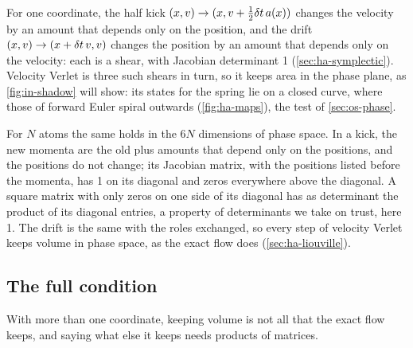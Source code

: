 For one coordinate, the half kick $(x, v) \to (x, v + \frac12\delta t\,a(x))$
changes the velocity by an amount that depends only on the position, and
the drift $(x, v) \to (x + \delta t\,v, v)$ changes the position by an amount
that depends only on the velocity: each is a shear, with Jacobian
determinant 1 (\cref{sec:ha-symplectic}). Velocity Verlet is three such
shears in turn, so it keeps area in the phase plane, as \cref{fig:in-shadow}
will show: its states for the spring lie on a closed curve, where those of
forward Euler spiral outwards (\cref{fig:ha-maps}), the test of
\cref{sec:os-phase}.

For $N$ atoms the same holds in the $6N$ dimensions of phase space. In a
kick, the new momenta are the old plus amounts that depend only on the
positions, and the positions do not change; its Jacobian matrix, with the
positions listed before the momenta, has 1 on its diagonal and zeros
everywhere above the diagonal. A square matrix with only zeros on one side
of its diagonal has as determinant the product of its diagonal entries, a
property of determinants we take on trust, here 1. The drift is the same
with the roles exchanged, so every step of velocity Verlet keeps volume in
phase space, as the exact flow does (\cref{sec:ha-liouville}).

\subsection*{The full condition}

With more than one coordinate, keeping volume is not all that the exact
flow keeps, and saying what else it keeps needs products of matrices.

